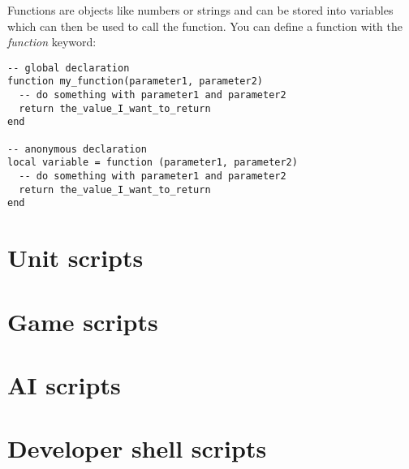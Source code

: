 \documentclass[a4paper,10pt]{article}
\begin{document}
Functions are objects like numbers or strings and can be stored into variables which can then be used to call the function. You can define a function with the \emph{function} keyword:

\begin{lstlisting}
-- global declaration
function my_function(parameter1, parameter2)
  -- do something with parameter1 and parameter2
  return the_value_I_want_to_return
end

-- anonymous declaration
local variable = function (parameter1, parameter2)
  -- do something with parameter1 and parameter2
  return the_value_I_want_to_return
end
\end{lstlisting}


\section{Unit scripts}

\section{Game scripts}

\section{AI scripts}

\section{Developer shell scripts}
\end{document}
